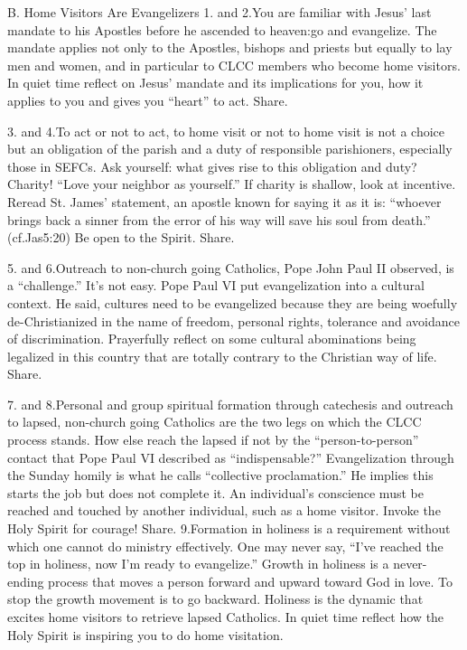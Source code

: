 \documentclass[oneside]{book}
\begin{document}
B. Home Visitors Are Evangelizers
1. and 2.You are familiar with Jesus' last mandate to his Apostles before he
ascended to heaven:go and evangelize. The mandate applies not only to the
Apostles, bishops and priests but equally to lay men and women, and in
particular to CLCC members who become home visitors. In quiet time reflect on
Jesus' mandate and its implications for you, how it applies to you and gives you
``heart'' to act. Share.

3. and 4.To act or not to act, to home visit or not to home visit is not a
choice but an obligation of the parish and a duty of responsible parishioners,
especially those in SEFCs. Ask yourself: what gives rise to this obligation and
duty? Charity! ``Love your neighbor as yourself.'' If charity is shallow, look
at incentive. Reread St. James' statement, an apostle known for saying it as it
is: ``whoever brings back a sinner from the error of his way will save his soul
from death.'' (cf.Jas5:20) Be open to the Spirit. Share.

5. and 6.Outreach to non-church going Catholics, Pope John Paul II observed, is
a ``challenge.'' It's not easy. Pope Paul VI put evangelization into a cultural
context. He said, cultures need to be evangelized because they are being
woefully de-Christianized in the name of freedom, personal rights, tolerance and
avoidance of discrimination. Prayerfully reflect on some cultural abominations
being legalized in this country that are totally contrary to the Christian way
of life. Share.

7. and 8.Personal and group spiritual formation through catechesis and outreach
to lapsed, non-church going Catholics are the two legs on which the CLCC process
stands. How else reach the lapsed if not by the ``person-to-person'' contact
that Pope Paul VI described as ``indispensable?'' Evangelization through the
Sunday homily is what he calls ``collective proclamation.'' He implies this
starts the job but does not complete it. An individual's conscience must be
reached and touched by another individual, such as a home visitor. Invoke the
Holy Spirit for courage! Share.
9.Formation in holiness is a requirement without which one cannot do ministry
effectively. One may never say, ``I've reached the top in holiness, now I'm
ready to evangelize.'' Growth in holiness is a never-ending process that moves a
person forward and upward toward God in love. To stop the growth movement is to
go backward. Holiness is the dynamic that excites home visitors to retrieve
lapsed Catholics. In quiet time reflect how the Holy Spirit is inspiring you to
do home visitation.
\end{document}
